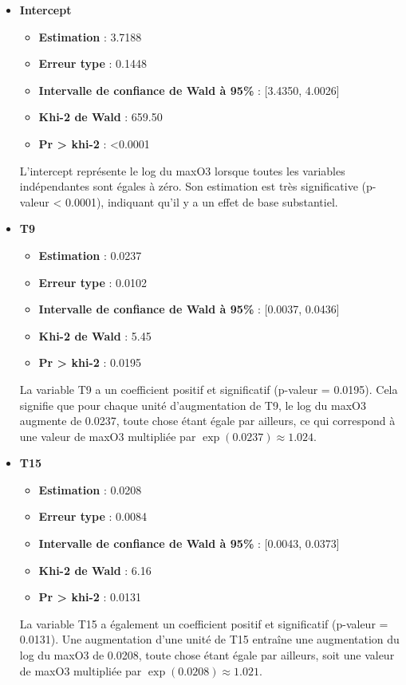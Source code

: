 \documentclass[12pt,a4paper]{article}
\begin{document}
\begin{itemize}
	\item \textbf{Intercept}
	\begin{itemize}
		\item \textbf{Estimation} : 3.7188
		\item \textbf{Erreur type} : 0.1448
		\item \textbf{Intervalle de confiance de Wald à 95\%} : [3.4350, 4.0026]
		\item \textbf{Khi-2 de Wald} : 659.50
		\item \textbf{Pr > khi-2} : <0.0001
	\end{itemize}
	L'intercept représente le log du maxO3 lorsque toutes les variables indépendantes sont égales à zéro. Son estimation est très significative (p-valeur < 0.0001), indiquant qu'il y a un effet de base substantiel.
	
	\item \textbf{T9}
	\begin{itemize}
		\item \textbf{Estimation} : 0.0237
		\item \textbf{Erreur type} : 0.0102
		\item \textbf{Intervalle de confiance de Wald à 95\%} : [0.0037, 0.0436]
		\item \textbf{Khi-2 de Wald} : 5.45
		\item \textbf{Pr > khi-2} : 0.0195
	\end{itemize}
	La variable T9 a un coefficient positif et significatif (p-valeur = 0.0195). Cela signifie que pour chaque unité d'augmentation de T9, le log du maxO3 augmente de 0.0237, toute chose étant égale par ailleurs, ce qui correspond à une valeur de maxO3 multipliée par $\exp(0.0237) \approx 1.024$.
	
	\item \textbf{T15}
	\begin{itemize}
		\item \textbf{Estimation} : 0.0208
		\item \textbf{Erreur type} : 0.0084
		\item \textbf{Intervalle de confiance de Wald à 95\%} : [0.0043, 0.0373]
		\item \textbf{Khi-2 de Wald} : 6.16
		\item \textbf{Pr > khi-2} : 0.0131
	\end{itemize}
	La variable T15 a également un coefficient positif et significatif (p-valeur = 0.0131). Une augmentation d'une unité de T15 entraîne une augmentation du log du maxO3 de 0.0208, toute chose étant égale par ailleurs, soit une valeur de maxO3 multipliée par $\exp(0.0208) \approx 1.021$.
	

\end{itemize}
\end{document}
